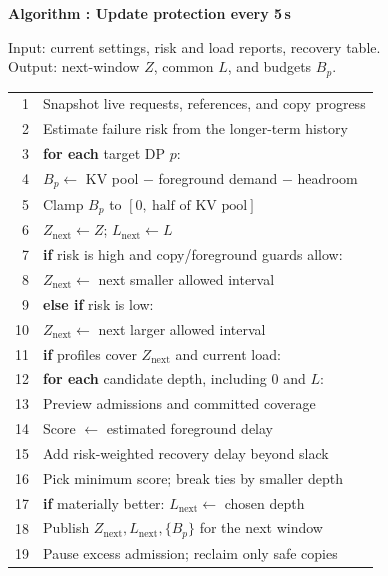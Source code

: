 \begin{figure}[t]
  \raggedright
  \label{alg:adapter}
  \noindent\textbf{Algorithm \thedesignalgorithm: Update protection every 5\,s}
  \par\smallskip
  \noindent Input: current settings, risk and load reports, recovery table.
  Output: next-window $Z$, common $L$, and budgets $B_p$.
  \par\smallskip
  \begin{tabularx}{\columnwidth}{@{}r@{\quad}X@{}}
    \toprule
    1 & Snapshot live requests, references, and copy progress \\
    2 & Estimate failure risk from the longer-term history \\
    3 & \textbf{for each} target DP $p$: \\
    4 & \quad$B_p\gets$ KV pool $-$ foreground demand $-$ headroom \\
    5 & \quad Clamp $B_p$ to $[0,\ \text{half of KV pool}]$ \\
    6 & $Z_{\mathrm{next}}\gets Z$; $L_{\mathrm{next}}\gets L$ \\
    7 & \textbf{if} risk is high and copy/foreground guards allow: \\
    8 & \quad$Z_{\mathrm{next}}\gets$ next smaller allowed interval \\
    9 & \textbf{else if} risk is low: \\
    10 & \quad$Z_{\mathrm{next}}\gets$ next larger allowed interval \\
    11 & \textbf{if} profiles cover $Z_{\mathrm{next}}$ and current load: \\
    12 & \quad\textbf{for each} candidate depth, including $0$ and $L$: \\
    13 & \qquad Preview admissions and committed coverage \\
    14 & \qquad Score $\gets$ estimated foreground delay \\
    15 & \qquad Add risk-weighted recovery delay beyond slack \\
    16 & \quad Pick minimum score; break ties by smaller depth \\
    17 & \quad \textbf{if} materially better: $L_{\mathrm{next}}\gets$ chosen depth \\
    18 & Publish $Z_{\mathrm{next}},L_{\mathrm{next}},\{B_p\}$ for the next window \\
    19 & Pause excess admission; reclaim only safe copies \\
    \bottomrule
  \end{tabularx}
\end{figure}

